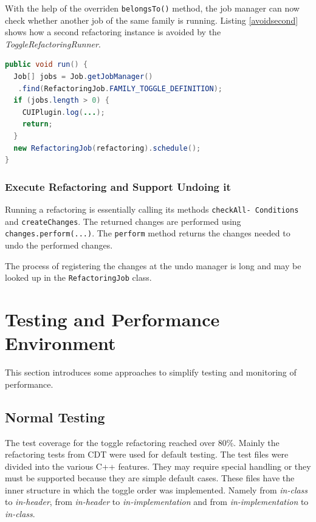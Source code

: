 With the help of the overriden \texttt{belongsTo()} method, the job manager can 
now check whether another job of the same family is running. Listing 
\ref{avoidsecond} shows how a second refactoring instance is avoided by the 
\textit{ToggleRefactoringRunner}.

\begin{lstlisting}[caption={ToggleRefactoringRunner avoiding a 2$^{nd}$ refactoring instance},
label={avoidsecond}, language=Java]
public void run() {
  Job[] jobs = Job.getJobManager()
   .find(RefactoringJob.FAMILY_TOGGLE_DEFINITION);
  if (jobs.length > 0) {
    CUIPlugin.log(...);
    return;
  }
  new RefactoringJob(refactoring).schedule();
}
\end{lstlisting}


\subsubsection{Execute Refactoring and Support Undoing it}
Running a refactoring is essentially calling its methods 
\texttt{checkAll- Conditions} and \texttt{createChanges}. The returned 
changes are performed using \texttt{changes.perform(...)}. The 
\texttt{perform} method returns the changes needed to undo the performed 
changes.

The process of registering the changes at the undo manager is long and may be 
looked up in the \texttt{RefactoringJob} class.

\section{Testing and Performance Environment}

This section introduces some approaches to simplify testing and monitoring of 
performance.

\subsection{Normal Testing}

The test coverage for the toggle refactoring reached over 80\%. Mainly the
refactoring tests from CDT were used for default testing. The test files were
divided into the various C++ features. They may require special handling or they
must be supported because they are simple default cases. These files have the
inner structure in which the toggle order was implemented. Namely from
\textit{in-class} to \textit{in-header}, from \textit{in-header} to
\textit{in-implementation} and from \textit{in-implementation} to
\textit{in-class}.

